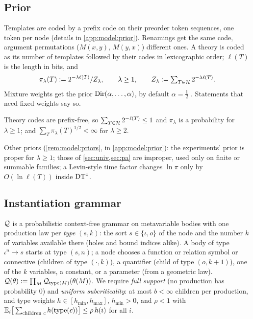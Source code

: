 \subsection{Prior}\label{sec:model:prior}

\begin{definition}\label{def:model:prior}
Templates are coded by a prefix code on their preorder token sequences, one token per node (details in \cref{app:model:prior}). Renamings get the same code, argument permutations ($M(x,y)$, $M(y,x)$) different ones. A theory is coded as its number of templates followed by their codes in lexicographic order; $\ell(T)$ is the length in bits, and
\[
\pi_\lambda(T):=2^{-\lambda\ell(T)}/Z_\lambda,\qquad \lambda\ge1,\qquad Z_\lambda:=\textstyle\sum_{T\in\mathcal{H}}2^{-\lambda\ell(T)}.
\]
Mixture weights get the prior $\mathrm{Dir}(\alpha,\dots,\alpha)$, by default $\alpha=\tfrac12$ \citep{krichevsky1981performance}. Statements that need fixed weights say so.
\end{definition}

\begin{lemma}[Kraft]\label{lem:model:kraft}
Theory codes are prefix-free, so $\sum_{T\in\mathcal{H}}2^{-\ell(T)}\le1$ and $\pi_\lambda$ is a probability for $\lambda\ge1$; and $\sum_T\pi_\lambda(T)^{1/2}<\infty$ for $\lambda\ge2$.
\end{lemma}

Other priors (\cref{rem:model:priors}, in \cref{app:model:prior}): the experiments' prior is proper for $\lambda\ge1$; those of \cref{sec:univ,sec:pa} are improper, used only on finite or summable families; a Levin-style time factor changes $\ln\pi$ only by $O(\ln\ell(T))$ inside $\mathrm{DT}^{\circ}$.

\subsection{Instantiation grammar}\label{sec:model:grammar}

\begin{definition}\label{def:model:grammar}
$\mathcal{Q}$ is a probabilistic context-free grammar on metavariable bodies with one production law per \emph{type} $(s,k)$: the sort $s\in\{\iota,o\}$ of the node and the number $k$ of variables available there (holes and bound indices alike). A body of type $\iota^n\to s$ starts at type $(s,n)$; a node chooses a function or relation symbol or connective (children of type $(\cdot,k)$), a quantifier (child of type $(o,k+1)$), one of the $k$ variables, a constant, or a parameter (from a geometric law). $\mathcal{Q}(\theta):=\prod_M\mathcal{Q}_{\mathrm{type}(M)}(\theta(M))$. We require \emph{full support} (no production has probability $0$) and \emph{uniform subcriticality}: at most $b<\infty$ children per production, and type weights $h\in[h_{\min},h_{\max}]$, $h_{\min}>0$, and $\rho<1$ with $\mathbb{E}_i\big[\sum_{\text{children }c}h(\mathrm{type}(c))\big]\le\rho\,h(i)$ for all $i$.
\end{definition}

